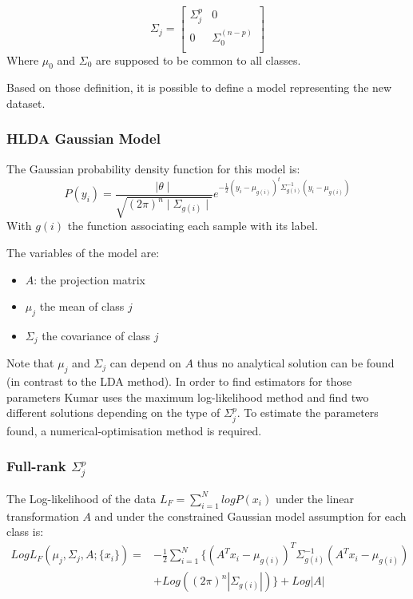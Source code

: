 $$\Sigma_j =
\left [
  \begin{array}{cc}
    \Sigma_j^p & 0\\
    0 & \Sigma_0^{(n-p)}\\
  \end{array}
\right ]
$$
Where $\mu_0$ and $\Sigma_0$ are supposed to be common to all classes.

Based on those definition, it is possible to define a model representing the new dataset.

\subsubsection{HLDA Gaussian Model}

The Gaussian probability density function for this model is:
$$P(y_i) = \frac{\mid \theta \mid}{\sqrt{(2\pi)^n \mid \Sigma_{g(i)} \mid}}
e^{-\frac{1}{2} (y_i - \mu_{g(i)})^t \Sigma_{g(i)}^{-1} (y_i - \mu_{g(i)})}$$
With $g(i)$ the function associating each sample with its label.

The variables of the model are:
\begin{itemize}
  \item $A$: the projection matrix
  \item $\mu_j$ the mean of class $j$
  \item $\Sigma_j$ the covariance of class $j$
\end{itemize}

Note that $\mu_j$ and $\Sigma_j$ can depend on $A$ thus no analytical solution can be found (in contrast to the LDA method). In order to find estimators for those parameters Kumar\cite{kumar.1997} uses the maximum log-likelihood method and find two different solutions depending on the type of $\Sigma_j^p$.
To estimate the parameters found, a numerical-optimisation method is required.

\subsubsection{Full-rank $\Sigma_j^p$}

The Log-likelihood of the data $L_F = \sum\limits_{i = 1}^N log P(x_i)$ under the linear transformation $A$ and under the constrained Gaussian model assumption for each class is:
$$\begin{array}{cl}
  Log L_F(\mu_j, \Sigma_j, A; \{x_i\}) = & - \frac{1}{2} \sum\limits_{i = 1}^N\{(A^T x_i - \mu_{g(i)})^T\Sigma_{g(i)}^{-1}
  (A^T x_i - \mu_{g(i)}) \\
  & + Log((2\pi)^n|\Sigma_{g(i)}|)\} + Log|A|
\end{array}$$

